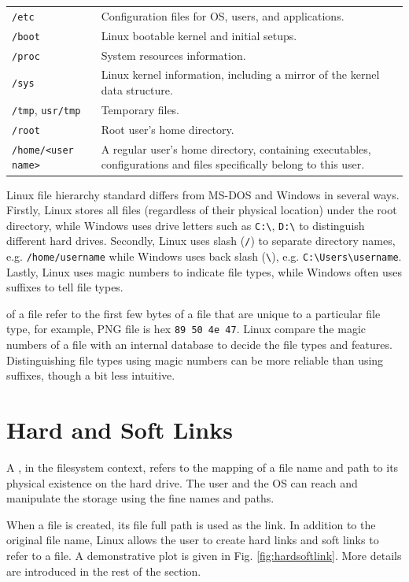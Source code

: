 \begin{table}[!htb]
\begin{tabularx}{\textwidth}{lX}
    \verb|/etc| & Configuration files for OS, users, and applications. \\ 
    \verb|/boot| & Linux bootable kernel and initial setups. \\ 
    \verb|/proc| & System resources information. \\ 
    \verb|/sys| & Linux kernel information, including a mirror of the kernel data structure. \\ 
    \verb|/tmp|, \verb|usr/tmp| & Temporary files. \\ 
    \verb|/root| & Root user's home directory. \\ 
    \verb|/home/<user name>| & A regular user's home directory, containing executables, configurations and files specifically belong to this user. \\
    \hline
  \end{tabularx}
\end{table}

Linux file hierarchy standard differs from MS-DOS and Windows in several ways. Firstly, Linux stores all files (regardless of their physical location) under the root directory, while Windows uses drive letters such as \verb|C:\|, \verb|D:\| to distinguish different hard drives. Secondly, Linux uses slash (\verb|/|) to separate directory names, e.g. \verb|/home/username| while Windows uses back slash (\verb|\|), e.g. \verb|C:\Users\username|. Lastly, Linux uses magic numbers to indicate file types, while Windows often uses suffixes to tell file types. 

 of a file refer to the first few bytes of a file that are unique to a particular file type, for example, PNG file is hex \verb|89 50 4e 47|. Linux compare the magic numbers of a file with an internal database to decide the file types and features. Distinguishing file types using magic numbers can be more reliable than using suffixes, though a bit less intuitive.

\section{Hard and Soft Links}

A , in the filesystem context, refers to the mapping of a file name and path to its physical existence on the hard drive. The user and the OS can reach and manipulate the storage using the fine names and paths.

When a file is created, its file full path is used as the link. In addition to the original file name, Linux allows the user to create hard links and soft links to refer to a file. A demonstrative plot is given in Fig. \ref{fig:hardsoftlink}. More details are introduced in the rest of the section.

